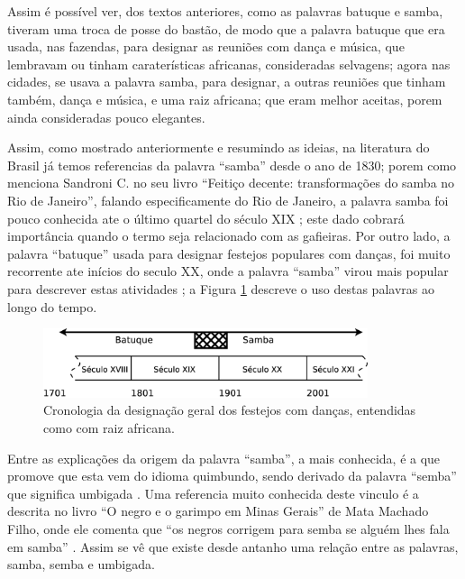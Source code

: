 Assim é possível ver, dos textos anteriores, como as palavras batuque e samba, 
tiveram uma troca de posse do bastão,
de modo que a palavra batuque que era usada, nas fazendas, 
para designar as reuniões com dança e música,
que lembravam ou tinham caraterísticas africanas, consideradas selvagens;
agora nas cidades, se usava a palavra samba, para designar,
a outras reuniões que tinham também, dança e música, 
e uma raiz africana; que eram melhor aceitas, porem ainda consideradas pouco elegantes. 



\PRLsep{*}


Assim, como mostrado anteriormente e resumindo as ideias, 
na literatura do Brasil já temos referencias da palavra ``samba'' desde o ano de 1830; 
porem como menciona Sandroni C. no seu livro ``Feitiço decente: transformações do samba no Rio de Janeiro'', 
falando especificamente do Rio de Janeiro, 
a palavra samba foi pouco conhecida ate o último quartel do século XIX \cite[pp. 86]{sandroni2001feitico};
este dado cobrará importância quando o termo seja relacionado com as gafieiras.
Por outro lado, a palavra  ``batuque'' usada para designar festejos populares com danças, foi muito recorrente ate inícios do seculo XX, 
onde a palavra ``samba'' virou mais popular para descrever estas atividades \cite[pp. 85]{sandroni2001feitico} \cite[pp. 47]{diniz2008almanaque}; 
a Figura \ref{fig:sambacrono} descreve o uso destas palavras ao longo do tempo.
\begin{figure}[h]
  \centering
    \includegraphics[width=0.85\textwidth]{chapters/cap-historia/samba-crono.eps}
  \caption{Cronologia da designação geral dos festejos com danças, entendidas como com raiz africana.}
  \label{fig:sambacrono}
\end{figure}


Entre as explicações da origem da palavra ``samba'', 
a mais conhecida, é a que promove que esta vem do idioma quimbundo, 
sendo derivado da palavra ``semba''  que significa umbigada \cite[pp. 47]{diniz2008almanaque} \cite[pp. 50]{da2015historia}.
Uma referencia muito conhecida deste vinculo é a descrita no livro ``O negro e o garimpo em Minas Gerais''
de Mata Machado Filho, onde ele comenta que ``os negros corrigem para semba se 
alguém lhes fala em samba'' \cite[pp. 85]{sandroni2001feitico}. Assim se vê que existe
desde antanho uma relação entre as palavras, 
samba, semba e umbigada.

